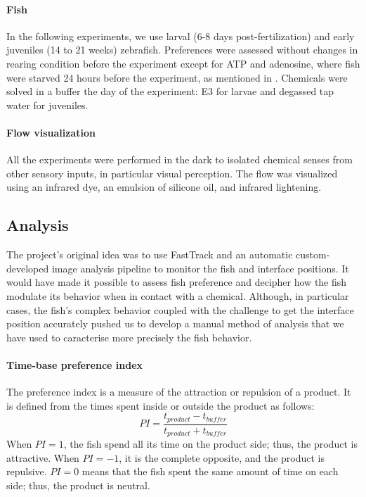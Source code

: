   \paragraph{Fish} In the following experiments, we use larval (6-8 days post-fertilization) and early juveniles (14 to 21 weeks) zebrafish. Preferences were assessed without changes in rearing condition before the experiment except for ATP and adenosine, where fish were starved 24 hours before the experiment, as mentioned in \cite{}. Chemicals were solved in a buffer the day of the experiment: E3 \cite{} for larvae and degassed tap water for juveniles.

  \paragraph{Flow visualization} All the experiments were performed in the dark to isolated chemical senses from other sensory inputs, in particular visual perception. The flow was visualized using an infrared dye, an emulsion of silicone oil, and infrared lightening.

  \subsection{Analysis}
  The project's original idea was to use FastTrack and an automatic custom-developed image analysis pipeline to monitor the fish and interface positions. It would have made it possible to assess fish preference and decipher how the fish modulate its behavior when in contact with a chemical. Although, in particular cases, the fish's complex behavior coupled with the challenge to get the interface position accurately pushed us to develop a manual method of analysis that we have used to caracterise more precisely the fish behavior.

  \paragraph{Time-base preference index} The preference index is a measure of the attraction or repulsion of a product. It is defined from the times spent inside or outside the product as follows:
  $$
  PI=\frac{t_{product}-t_{buffer}}{t_{product}+t_{buffer}}
  $$
  \noindent When $PI=1$, the fish spend all its time on the product side; thus, the product is attractive. When $PI=-1$, it is the complete opposite, and the product is repulsive. $PI=0$ means that the fish spent the same amount of time on each side; thus, the product is neutral.

